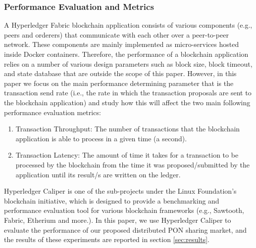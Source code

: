 \subsubsection{Performance Evaluation and Metrics}
A Hyperledger Fabric blockchain application consists of various components (e.g., peers and orderers) that communicate with each other over a peer-to-peer network. These components are mainly implemented as micro-services hosted inside Docker containers. Therefore, the performance of a blockchain application relies on a number of various design parameters such as block size, block timeout, and state database \cite{8526892} that are outside the scope of this paper. However, in this paper we focus on the main performance determining parameter that is the transaction send rate (i.e., the rate in which the transaction proposals are sent to the blockchain application) and study how this will affect the two main following performance evaluation metrics:

\begin{enumerate}
    \item Transaction Throughput: The number of transactions that the blockchain application is able to process in a given time (a second).
    \item Transaction Latency: The amount of time it takes for a transaction to be processed by the blockchain from the time it was proposed/submitted by the application until its result/s are written on the ledger.
\end{enumerate}

Hyperledger Caliper \cite{caliper} is one of the sub-projects under the Linux Foundation's blockchain initiative, which is designed to provide a benchmarking and performance evaluation tool for various blockchain frameworks (e.g., Sawtooth, Fabric, Etherium and more.). In this paper, we use Hyperledger Caliper to evaluate the performance of our proposed distributed \ac{PON} sharing market, and the results of these experiments are reported in section \ref{sec:results}.
